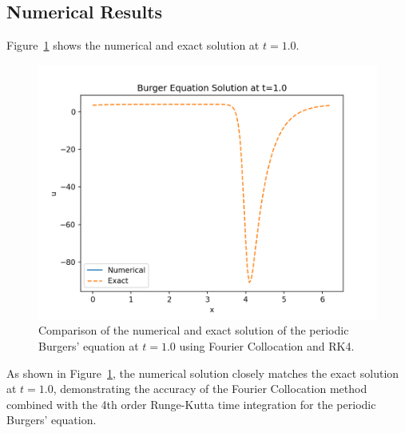 \documentclass{article}
\begin{document}
\subsection*{Numerical Results}
Figure~\ref{fig:burgers_solution} shows the numerical and exact solution at $t=1.0$.

\begin{figure}[htbp]
    \centering
    \includegraphics{figure/burgers_solution.png}
    \caption{Comparison of the numerical and exact solution of the periodic Burgers' equation at $t=1.0$ using Fourier Collocation and RK4.}
    \label{fig:burgers_solution}
\end{figure}

As shown in Figure~\ref{fig:burgers_solution}, the numerical solution closely matches the exact solution at $t=1.0$, demonstrating the accuracy of the Fourier Collocation method combined with the 4th order Runge-Kutta time integration for the periodic Burgers' equation.
\end{document}
